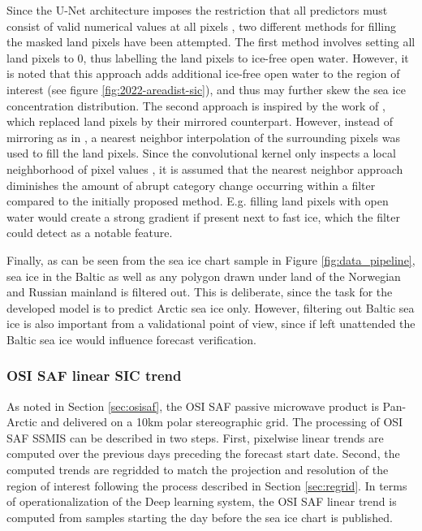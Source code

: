 \documentclass[../main/thesis]{subfiles}
\begin{document}
Since the U-Net architecture imposes the restriction that all predictors must consist of valid numerical values at all pixels \citep{Ronneberger2015}, two different methods for filling the masked land pixels have been attempted. The first method involves setting all land pixels to 0, thus labelling the land pixels to ice-free open water. However, it is noted that this approach adds additional ice-free open water to the region of interest (see figure \ref{fig:2022-areadist-sic}), and thus may further skew the sea ice concentration distribution. The second approach is inspired by the work of \citet{Wang2017}, which replaced land pixels by their mirrored counterpart. However, instead of mirroring as in \citet{Wang2017}, a nearest neighbor interpolation of the surrounding pixels was used to fill the land pixels. Since the convolutional kernel only inspects a local neighborhood of pixel values \citep{Yamashita2018}, it is assumed that the nearest neighbor approach diminishes the amount of abrupt category change occurring within a filter compared to the initially proposed method. E.g. filling land pixels with open water would create a strong gradient if present next to fast ice, which the filter could detect as a notable feature.

Finally, as can be seen from the sea ice chart sample in Figure \ref{fig:data_pipeline}, sea ice in the Baltic as well as any polygon drawn under land of the Norwegian and Russian mainland is filtered out. This is deliberate, since the task for the developed model is to predict Arctic sea ice only. However, filtering out Baltic sea ice is also important from a validational point of view, since if left unattended the Baltic sea ice would influence forecast verification. 

\subsubsection{OSI SAF linear SIC trend}
\label{sec:data_trend}
As noted in Section \ref{sec:osisaf}, the OSI SAF passive microwave product is Pan-Arctic and delivered on a 10km polar stereographic grid. The processing of OSI SAF SSMIS can be described in two steps. First, pixelwise linear trends are computed over the previous days preceding the forecast start date. Second, the computed trends are regridded to match the projection and resolution of the region of interest following the process described in Section \ref{sec:regrid}. In terms of operationalization of the Deep learning system, the OSI SAF linear trend is computed from samples starting the day before the sea ice chart is published.
\end{document}
